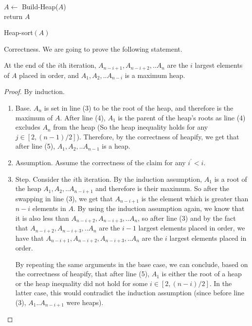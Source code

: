 \begin{algorithm}
    $A \leftarrow$ Build-Heap($A$)\\
	  return $A$
\caption{Heap-sort$(A)$}
  \end{algorithm}
Correctness. We are going to prove the following statement.
  \begin{claim}   
At the end of the $i$th iteration, $A_{n-i+1},A_{n-i+2},..A_{n}$ are the $i$ largest elements of $A$ placed in order, and $A_{1},A_{2},..A_{n-i}$ is a maximum heap.
  \end{claim}
\begin{proof}
By induction.
\begin{enumerate}
  \item Base. $A_{n}$ is set in line (3) to be the root of the heap, and therefore is the maximum of $A$. After line (4), $A_{1}$ is the parent of the heap's roots as line (4) excludes $A_{n}$ from the heap (So the heap inequality holds for any $j\in [2,(n-1)/2]$). Therefore, by the correctness of heapify, we get that after line (5), $A_{1},A_{2},..A_{n-1}$ is a heap.
  \item Assumption. Assume the correctness of the claim for any $i^{\prime}<i$.
  \item Step. Consider the $i$th iteration. By the induction assumption, $A_{1}$ is a root of the heap $A_{1},A_{2},..A_{n-i+1}$ and therefore is their maximum. So after the swapping in line (3), we get that $A_{n-i+1}$ is the element which is greater than $n-i$ elements in $A$. By using the induction assumption again, we know that it is also less than $A_{n-i+2},A_{n-i+3},..A_{n}$, so after line (3) and by the fact that $A_{n-i+2},A_{n-i+3},..A_{n}$ are the $i-1$ largest elements placed in order, we have that $A_{n-i+1},A_{n-i+2},A_{n-i+3},..A_{n}$ are the $i$ largest elements placed in order. 

    By repeating the same arguments in the base case, we can conclude, based on the correctness of heapify, that after line (5), $A_{1}$ is either the root of a heap or the heap inequality did not hold for some $i\in [2,(n-i)/2]$. In the latter case, this would contradict the induction assumption (since before line (3), $A_{1}..A_{n-i+1}$ were heaps).
\end{enumerate}
\end{proof}






